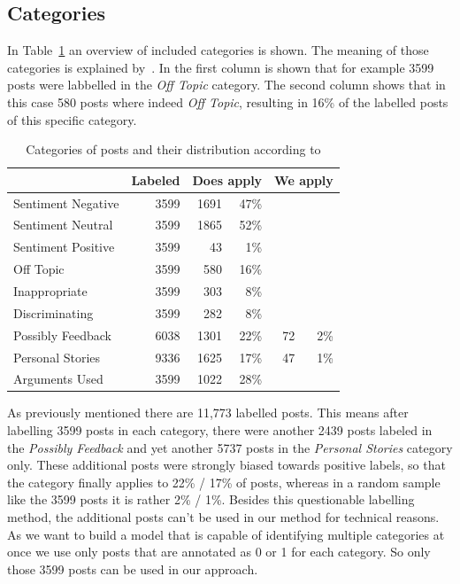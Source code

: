 \documentclass[11pt,a4paper]{article}
\begin{document}
\subsection{Categories}
In Table~\ref{tab:categories} an overview of included categories is shown. The meaning of those categories is explained by~.
In the first column is shown that for example 3599 posts were labbelled in the \textit{Off Topic} category. 
The second column shows that in this case 580 posts where indeed \textit{Off Topic}, resulting in 16\% of the labelled posts of this specific category. 

\begin{table}
	\centering\small
	\begin{tabular}{l r r r r r}
		& Labeled & \multicolumn{2}{c}{Does apply} & \multicolumn{2}{c}{We apply} \\
		\hline
		Sentiment Negative & 3599 & 1691 & 47\% \\
		Sentiment Neutral & 3599 & 1865 & 52\% \\
		Sentiment Positive & 3599 & 43 & 1\% \\
		Off Topic & 3599 & 580 & 16\% \\
		Inappropriate & 3599 & 303 & 8\%\\
		Discriminating & 3599 & 282 & 8\%\\
		Possibly Feedback & 6038 & 1301 & 22\% & 72 & 2\%\\
		Personal Stories & 9336 & 1625 & 17\% & 47 & 1\%\\
		Arguments Used & 3599 & 1022 & 28\%\\
	\end{tabular}
	\caption{Categories of posts and their distribution according to \cite{Schabus17}}
	\label{tab:categories}
\end{table}

As previously mentioned there are 11,773 labelled posts. This means after labelling 3599 posts in each category, there were another 2439 posts labeled in the \textit{Possibly Feedback} and yet another 5737 posts in the \textit{Personal Stories} category only.
These additional posts were strongly biased towards positive labels, so that the category finally applies to 22\% / 17\% of posts, whereas in a random sample like the 3599 posts it is rather 2\% / 1\%.
Besides this questionable labelling method, the additional posts can't be used in our method for technical reasons.
As we want to build a model that is capable of identifying multiple categories at once we use only posts that are annotated as 0 or 1 for each category.
So only those 3599 posts can be used in our approach.  
\end{document}
